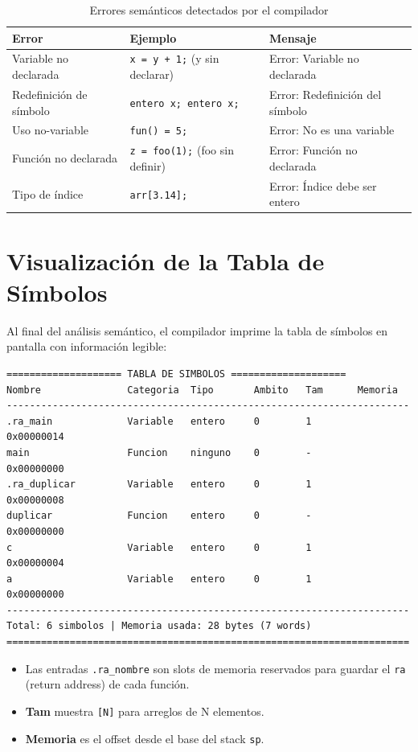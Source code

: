 \begin{table}[H]
\centering
\begin{tabular}{lll}
\toprule
\textbf{Error} & \textbf{Ejemplo} & \textbf{Mensaje} \\
\midrule
Variable no declarada & \texttt{x = y + 1;} (y sin declarar) & Error: Variable no declarada \\
Redefinición de símbolo & \texttt{entero x; entero x;} & Error: Redefinición del símbolo \\
Uso no-variable & \texttt{fun() = 5;} & Error: No es una variable \\
Función no declarada & \texttt{z = foo(1);} (foo sin definir) & Error: Función no declarada \\
Tipo de índice & \texttt{arr[3.14];} & Error: Índice debe ser entero \\
\bottomrule
\end{tabular}
\caption{Errores semánticos detectados por el compilador}
\label{tab:errores-semanticos}
\end{table}

\section{Visualización de la Tabla de Símbolos}

Al final del análisis semántico, el compilador imprime la tabla de símbolos en pantalla con información legible:

\begin{verbatim}
==================== TABLA DE SIMBOLOS ====================
Nombre               Categoria  Tipo       Ambito   Tam      Memoria
----------------------------------------------------------------------
.ra_main             Variable   entero     0        1        0x00000014
main                 Funcion    ninguno    0        -        0x00000000
.ra_duplicar         Variable   entero     0        1        0x00000008
duplicar             Funcion    entero     0        -        0x00000000
c                    Variable   entero     0        1        0x00000004
a                    Variable   entero     0        1        0x00000000
----------------------------------------------------------------------
Total: 6 simbolos | Memoria usada: 28 bytes (7 words)
======================================================================
\end{verbatim}

\begin{itemize}
    \item Las entradas \texttt{.ra\_nombre} son slots de memoria reservados para guardar el \texttt{ra} (return address) de cada función.
    \item \textbf{Tam} muestra \texttt{[N]} para arreglos de N elementos.
    \item \textbf{Memoria} es el offset desde el base del stack \texttt{sp}.
\end{itemize}
